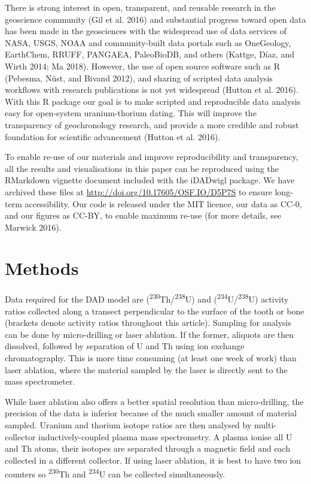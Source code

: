 \documentclass[]{elsarticle} %
\begin{document}
There is strong interest in open, transparent, and reusable research in the geoscience community (Gil et al. 2016) and substantial progress toward open data has been made in the geosciences with the widespread use of data services of NASA, USGS, NOAA and community-built data portals such as OneGeology, EarthChem, RRUFF, PANGAEA, PaleoBioDB, and others (Kattge, Díaz, and Wirth 2014; Ma 2018). However, the use of open source software such as R (Pebesma, Nüst, and Bivand 2012), and sharing of scripted data analysis workflows with research publications is not yet widespread (Hutton et al. 2016). With this R package our goal is to make scripted and reproducible data analysis easy for open-system uranium-thorium dating. This will improve the transparency of geochronology research, and provide a more credible and robust foundation for scientific advancement (Hutton et al. 2016).

To enable re-use of our materials and improve reproducibility and transparency, all the results and visualisations in this paper can be reproduced using the RMarkdown vignette document included with the iDADwigl package. We have archived these files at \url{http://doi.org/10.17605/OSF.IO/D5P7S} to ensure long-term accessibility. Our code is released under the MIT licence, our data as CC-0, and our figures as CC-BY, to enable maximum re-use (for more details, see Marwick 2016).

\hypertarget{methods}{%
\section{Methods}\label{methods}}

Data required for the DAD model are (\textsuperscript{230}Th/\textsuperscript{238}U) and (\textsuperscript{234}U/\textsuperscript{238}U) activity ratios collected along a transect perpendicular to the surface of the tooth or bone (brackets denote activity ratios throughout this article). Sampling for analysis can be done by micro-drilling or laser ablation. If the former, aliquots are then dissolved, followed by separation of U and Th using ion exchange chromatography. This is more time consuming (at least one week of work) than laser ablation, where the material sampled by the laser is directly sent to the mass spectrometer.

While laser ablation also offers a better spatial resolution than micro-drilling, the precision of the data is inferior because of the much smaller amount of material sampled. Uranium and thorium isotope ratios are then analysed by multi-collector inductively-coupled plasma mass spectrometry. A plasma ionise all U and Th atoms, their isotopes are separated through a magnetic field and each collected in a different collector. If using laser ablation, it is best to have two ion counters so \textsuperscript{230}Th and \textsuperscript{234}U can be collected simultaneously.
\end{document}
